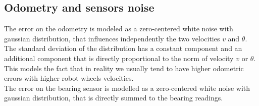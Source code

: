 \subsection{Odometry and sensors noise}
The error on the odometry is modeled as a zero-centered white noise with gaussian distribution, that influences independently the two velocities $v$ and $\theta$.
The standard deviation of the distribution has a constant component and an additional component that is directly proportional to the norm of velocity $v$ or $\theta$.
This models the fact that in reality we usually tend to have higher odometric errors with higher robot wheels velocities.
\\
The error on the bearing sensor is modelled as a zero-centered white noise with gaussian distribution, that is directly summed to the bearing readings.\\
